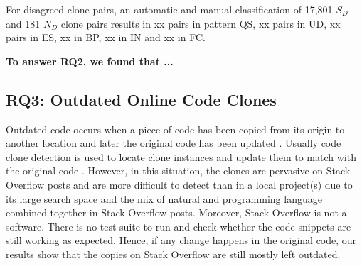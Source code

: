 \documentclass{sig-alternate-05-2015}
\begin{document}
\begin{table}
	\centering
	\caption{Classification results of agreed and disagreed clone pairs.}
	\label{tab:classification_good_o}
	\small
\end{table}

For disagreed clone pairs, an automatic and manual classification of 17,801 $S_D$ and 181 $N_D$ clone pairs results in xx pairs in pattern QS, xx pairs in UD, xx pairs in ES, xx in BP, xx in IN and xx in FC. 

\textbf{To answer RQ2, we found that ...}

\subsection{RQ3: Outdated Online Code Clones}


Outdated code occurs when a piece of code has been copied from its origin to another location and later the original code has been updated \cite{Xia2014}. Usually code clone detection is used to locate clone instances and update them to match with the original code \cite{Bellon2007}. However, in this situation, the clones are pervasive on Stack Overflow posts and are more difficult to detect than in a local project(s) due to its large search space and the mix of natural and programming language combined together in Stack Overflow posts. Moreover, Stack Overflow is not a software. There is no test suite to run and check whether the code snippets are still working as expected. Hence, if any change happens in the original code, our results show that the copies on Stack Overflow are still mostly left outdated. 
\end{document}
